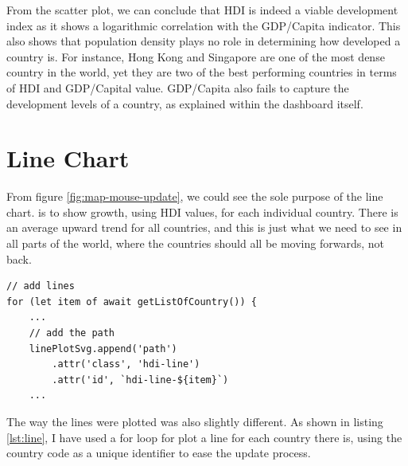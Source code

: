 \documentclass{scrreprt}
\begin{document}
From the scatter plot, we can conclude that HDI is indeed a viable development index as it shows a logarithmic correlation with the GDP/Capita indicator. This also shows that population density plays no role in determining how developed a country is. For instance, Hong Kong and Singapore are one of the most dense country in the world, yet they are two of the best performing countries in terms of HDI and GDP/Capital value. GDP/Capita also fails to capture the development levels of a country, as explained within the dashboard itself. 

\section{Line Chart}
From figure \ref{fig:map-mouse-update}, we could see the sole purpose of the line chart. is to show growth, using HDI values, for each individual country. There is an average upward trend for all countries, and this is just what we need to see in all parts of the world, where the countries should all be moving forwards, not back. 
\begin{lstlisting}[label = {lst:line}, caption = {Line Set Up}]
// add lines
for (let item of await getListOfCountry()) {
    ...
    // add the path
    linePlotSvg.append('path')
        .attr('class', 'hdi-line')
        .attr('id', `hdi-line-${item}`)
    ...
\end{lstlisting}

The way the lines were plotted was also slightly different. As shown in listing \ref{lst:line}, I have used a for loop for plot a line for each country there is, using the country code as a unique identifier to ease the update process. 
\end{document}
